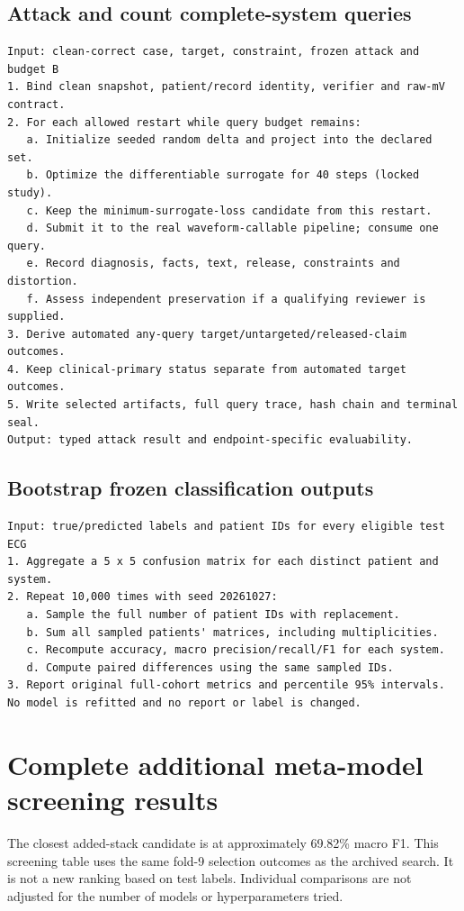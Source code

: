 \subsection{Attack and count complete-system queries}
\begin{lstlisting}
Input: clean-correct case, target, constraint, frozen attack and budget B
1. Bind clean snapshot, patient/record identity, verifier and raw-mV contract.
2. For each allowed restart while query budget remains:
   a. Initialize seeded random delta and project into the declared set.
   b. Optimize the differentiable surrogate for 40 steps (locked study).
   c. Keep the minimum-surrogate-loss candidate from this restart.
   d. Submit it to the real waveform-callable pipeline; consume one query.
   e. Record diagnosis, facts, text, release, constraints and distortion.
   f. Assess independent preservation if a qualifying reviewer is supplied.
3. Derive automated any-query target/untargeted/released-claim outcomes.
4. Keep clinical-primary status separate from automated target outcomes.
5. Write selected artifacts, full query trace, hash chain and terminal seal.
Output: typed attack result and endpoint-specific evaluability.
\end{lstlisting}

\subsection{Bootstrap frozen classification outputs}
\begin{lstlisting}
Input: true/predicted labels and patient IDs for every eligible test ECG
1. Aggregate a 5 x 5 confusion matrix for each distinct patient and system.
2. Repeat 10,000 times with seed 20261027:
   a. Sample the full number of patient IDs with replacement.
   b. Sum all sampled patients' matrices, including multiplicities.
   c. Recompute accuracy, macro precision/recall/F1 for each system.
   d. Compute paired differences using the same sampled IDs.
3. Report original full-cohort metrics and percentile 95% intervals.
No model is refitted and no report or label is changed.
\end{lstlisting}

\section{Complete additional meta-model screening results}
\label{app:candidates}
\begin{table}[H]\centering\small

\caption{All 17 additional validation-screened candidate sources. Standalone scores use fold-9 outputs; added-stack values are each candidate's best patient-grouped stacker OOF selection score. The released baseline is 69.876\% OOF macro F1. The candidate labels are the experiment's recorded names, not new fitted models.}
\end{table}
The closest added-stack candidate is  at approximately 69.82\% macro F1. This screening table uses the same fold-9 selection outcomes as the archived search. It is not a new ranking based on test labels. Individual comparisons are not adjusted for the number of models or hyperparameters tried.

